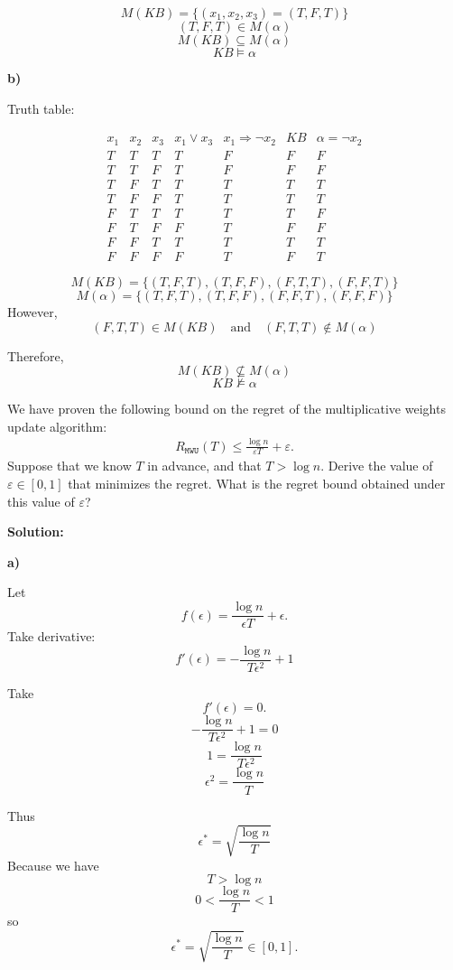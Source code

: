 \documentclass[10pt,a4paper]{exam}
\newcommand{\eps}{\varepsilon}
\begin{document}
\begin{questions}
\[
M(KB)=\{(x_1,x_2,x_3)=(T,F,T)\}
\]
\[
(T,F,T)\in M(\alpha)
\]
\[
M(KB)\subseteq M(\alpha)
\]
\[
KB\models \alpha
\]

\textbf{b)}

Truth table:

\[
\begin{array}{c|c|c|c|c|c|c}
x_1 & x_2 & x_3 & x_1\lor x_3 & x_1\Rightarrow \neg x_2 & KB & \alpha=\neg x_2 \\
\hline
T & T & T & T & F & F & F \\
T & T & F & T & F & F & F \\
T & F & T & T & T & T & T \\
T & F & F & T & T & T & T \\
F & T & T & T & T & T & F \\
F & T & F & F & T & F & F \\
F & F & T & T & T & T & T \\
F & F & F & F & T & F & T
\end{array}
\]

\[
M(KB)=\{(T,F,T),(T,F,F),(F,T,T),(F,F,T)\}
\]
\[
M(\alpha)=\{(T,F,T),(T,F,F),(F,F,T),(F,F,F)\}
\]
However,
\[
(F,T,T)\in M(KB) \quad \text{and} \quad (F,T,T)\notin M(\alpha)
\]

Therefore,
\[
M(KB)\nsubseteq M(\alpha)
\]
\[
KB\not\models \alpha
\]

\newpage

\question[15]
We have proven the following bound on the regret of the multiplicative weights update algorithm:
\begin{align*}
    R_{\texttt{MWU}}(T) \le \frac{\log n}{\eps T}+\eps.
\end{align*}
Suppose that we know $T$ in advance, and that $T > \log n$.
Derive the value of $\eps\in [0,1]$ that minimizes the regret. What is the regret bound obtained under this value of $\eps$?

\textbf{Solution:}

\textbf{a)}

Let
\[
f(\epsilon)=\frac{\log n}{\epsilon T}+\epsilon.
\]
Take derivative:
\[
f'(\epsilon)
=
-\frac{\log n}{T\epsilon^2}+1
\]

Take
\[
f'(\epsilon)=0.
\]
\[
-\frac{\log n}{T\epsilon^2}+1=0
\]
\[
1=\frac{\log n}{T\epsilon^2}
\]
\[
\epsilon^2=\frac{\log n}{T}
\]

Thus
\[
\epsilon^*=\sqrt{\frac{\log n}{T}}
\]
Because we have
\[
T>\log n
\]
\[
0<\frac{\log n}{T}<1
\]
so
\[
\epsilon^*=\sqrt{\frac{\log n}{T}}\in[0,1].
\]


\end{questions}
\end{document}
